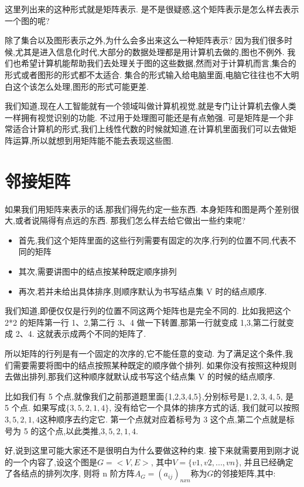 这里列出来的这种形式就是矩阵表示. 是不是很疑惑,这个矩阵表示是怎么样去表示一个图的呢? 

除了集合以及图形表示之外,为什么会多出来这么一种矩阵表示? 因为我们很多时候,尤其是进入信息化时代,大部分的数据处理都是用计算机去做的,图也不例外. 我们也希望计算机能帮助我们去处理关于图的这些数据,然而对于计算机而言,集合的形式或者图形的形式都不太适合. 集合的形式输入给电脑里面,电脑它往往也不大明白这个该怎么处理,图形的形式可能更差. 

我们知道,现在人工智能就有一个领域叫做计算机视觉,就是专门让计算机去像人类一样拥有视觉识别的功能. 不过用于处理图可能还是有点勉强. 可是矩阵是一个非常适合计算机的形式,我们上线性代数的时候就知道,在计算机里面我们可以去做矩阵运算,所以就想到用矩阵能不能去表现这些图. 

\section{邻接矩阵}

如果我们用矩阵来表示的话,那我们得先约定一些东西. 本身矩阵和图是两个差别很大,或者说隔得有点远的东西. 那我们怎么样去给它做出一些约束呢? 

\begin{itemize}
  \item 首先,我们这个矩阵里面的这些行列需要有固定的次序,行列的位置不同,代表不同的矩阵
  \item 其次,需要讲图中的结点按某种既定顺序排列
  \item 再次,若并未给出具体排序,则顺序默认为书写结点集 V 时的结点顺序. 
\end{itemize}

我们知道,即便仅仅是行列的位置不同这两个矩阵也是完全不同的. 比如我把这个 2*2 的矩阵第一行 1、2,第二行 3、4 做一下转置,那第一行就变成 1,3,第二行就变成 2、4. 这就表示成两个不同的矩阵了. 

所以矩阵的行列是有一个固定的次序的,它不能任意的变动. 为了满足这个条件,我们需要需要将图中的结点按照某种既定的顺序做个排列. 如果你没有按照这种规则去做出排列,那我们这种顺序就默认成书写这个结点集 V 的时候的结点顺序. 

比如我们有 5 个点,就像我们之前那道题里面\{1,2,3,4,5\},分别标号是$1,2,3,4,5$, 是 5 个点. 如果写成$\{3,5,2,1,4\}$, 没有给它一个具体的排序方式的话, 我们就可以按照$3,5,2,1,4$这种顺序去约定它. 第一个点就对应着标号为 3 这个点,第二个点就是标号为 5 的这个点,以此类推,$3,5,2,1,4$. 

好,说到这里可能大家还不是很明白为什么要做这种约束. 接下来就需要用到刚才说的一个内容了,设这个图是$G=<V,E>$, 其中$V=\{v1,v2,...,vn\}$, 并且已经确定了各结点的排列次序, 则将 n 阶方阵$A_G=(a_{ij})_{nxn}$称为$G$的邻接矩阵,其中: 

